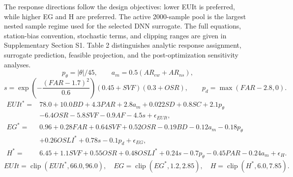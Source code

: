 \documentclass[10pt]{article}
\newcommand{\AnalyticEquations}{%
\[
p_\theta = |\theta| / 45,\qquad
a_m = 0.5(AR_{ew}+AR_{ns}),
\]
\[
s = \exp\left(-\frac{(FAR-1.7)^2}{0.6}\right)(0.45+SVF)(0.3+OSR),
\qquad
p_d = \max(FAR-2.8,0).
\]
\[
\begin{aligned}
EUIt^\ast ={}& 78.0 + 10.0BD + 4.3PAR + 2.8a_m + 0.022SD + 0.8SC + 2.1p_\theta \\
& - 6.4OSR - 5.8SVF - 0.9AF - 4.5s + \epsilon_{EUIt},\\
EG^\ast ={}& 0.96 + 0.28FAR + 0.64SVF + 0.52OSR - 0.19BD - 0.12a_m - 0.18p_\theta \\
& + 0.26OSLI^\ast + 0.78s - 0.1p_d + \epsilon_{EG},\\
H^\ast ={}& 6.45 + 1.1SVF + 0.55OSR + 0.48OSLI^\ast + 0.24s - 0.7p_\theta - 0.45PAR - 0.24a_m + \epsilon_H .
\end{aligned}
\]
\[
EUIt = \operatorname{clip}(EUIt^\ast,66.0,96.0),\quad
EG = \operatorname{clip}(EG^\ast,1.2,2.85),\quad
H = \operatorname{clip}(H^\ast,6.0,7.85).
\]
}
\begin{document}
\begin{revisionbox}
The response directions follow the design objectives: lower EUIt is preferred, while higher EG and H are preferred. The active 2000-sample pool is the largest nested sample regime used for the selected DNN surrogate. The full equations, station-bias convention, stochastic terms, and clipping ranges are given in Supplementary Section S1. Table 2 distinguishes analytic response assignment, surrogate prediction, feasible projection, and the post-optimization sensitivity analyses.
\revisionseparator
{}
\AnalyticEquations
\end{revisionbox}
\end{document}
